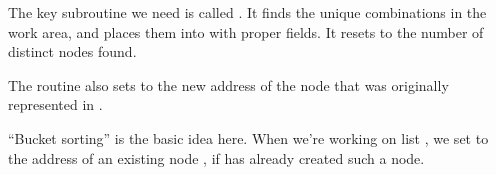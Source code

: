 The key subroutine we need is called . It finds the
unique combinations  in the
work area, and places them into  with proper 
fields.
It resets  to the number of distinct nodes found.

The  routine also sets  to the new address of
the
node that was originally represented in .

``Bucket sorting'' is the basic idea here.
When we're working on list , we set  to
the address of an existing node , if  has
already created such a node.

